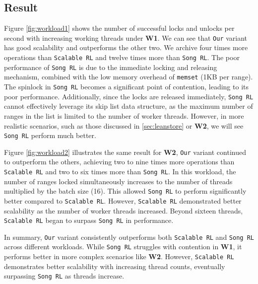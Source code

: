 \subsection{Result}

Figure \ref{fig:workload1} shows the number of successful locks and unlocks per second with increasing working threads under \textbf{W1}. We can see that \texttt{Our} variant has good scalability and outperforms the other two. We archive four times more operations than \texttt{Scalable RL} and twelve times more than \texttt{Song RL}. The poor performance of \texttt{Song RL} is due to the immediate locking and releasing mechanism, combined with the low memory overhead of \texttt{memset} (1KB per range). The spinlock in \texttt{Song RL} becomes a significant point of contention, leading to its poor performance. Additionally, since the locks are released immediately, \texttt{Song RL} cannot effectively leverage its skip list data structure, as the maximum number of ranges in the list is limited to the number of worker threads. However, in more realistic scenarios, such as those discussed in \ref{sec:leanstore} or \textbf{W2}, we will see \texttt{Song RL} perform much better.

Figure \ref{fig:workload2} illustrates the same result for \textbf{W2}, \texttt{Our} variant continued to outperform the others, achieving two to nine times more operations than \texttt{Scalable RL} and two to six times more than \texttt{Song RL}. In this workload, the number of ranges locked simultaneously increases to the number of threads multiplied by the batch size (16). This allowed \texttt{Song RL} to perform significantly better compared to \texttt{Scalable RL}. However, \texttt{Scalable RL} demonstrated better scalability as the number of worker threads increased. Beyond sixteen threads, \texttt{Scalable RL} began to surpass \texttt{Song RL} in performance.

In summary, \texttt{Our} variant consistently outperforms both \texttt{Scalable RL} and \texttt{Song RL} across different workloads. While \texttt{Song RL} struggles with contention in \textbf{W1}, it performs better in more complex scenarios like \textbf{W2}. However, \texttt{Scalable RL} demonstrates better scalability with increasing thread counts, eventually surpassing \texttt{Song RL} as threads increase.

